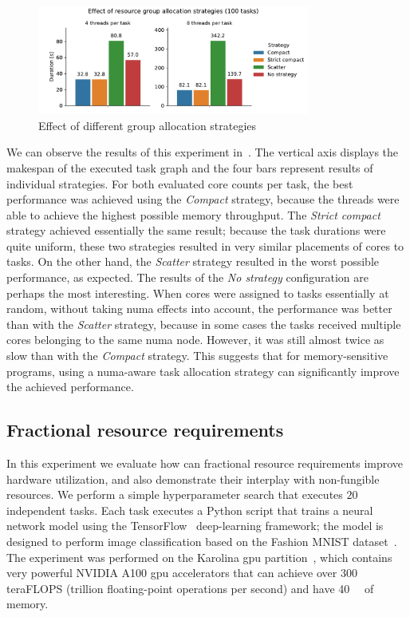 \begin{figure}[h]
	\centering
	\includegraphics[width=0.8\textwidth]{imgs/hq/charts/numa}
	\caption{Effect of different group allocation strategies}
	\label{fig:hq-numa}
\end{figure}

We can observe the results of this experiment in~. The vertical axis displays
the makespan of the executed task graph and the four bars represent results of individual
strategies. For both evaluated core counts per task, the best performance was achieved using the
\emph{Compact} strategy, because the threads were able to achieve the highest possible
memory throughput. The \emph{Strict compact} strategy achieved essentially the same result;
because the task durations were quite uniform, these two strategies resulted in very similar
placements of cores to tasks. On the other hand, the \emph{Scatter} strategy resulted in
the worst possible performance, as expected. The results of the \emph{No strategy}
configuration are perhaps the most interesting. When cores were assigned to tasks essentially at
random, without taking \gls{numa} effects into account, the performance was better
than with the \emph{Scatter} strategy, because in some cases the tasks received multiple
cores belonging to the same \gls{numa} node. However, it was still almost twice as
slow than with the \emph{Compact} strategy. This suggests that for memory-sensitive
programs, using a \gls{numa}-aware task allocation strategy can significantly improve
the achieved performance.

\subsection{Fractional resource requirements}
\label{sec:hq-exp-fractional-resources}
In this experiment we evaluate how can fractional resource requirements improve hardware
utilization, and also demonstrate their interplay with non-fungible resources. We perform a
simple hyperparameter search that executes $20$ independent tasks. Each task executes a Python
script that trains a neural network model using the TensorFlow~\cite{tensorflow}
deep-learning framework; the model is designed to perform image classification based on the
Fashion MNIST dataset~\cite{fashionmnist}. The experiment was performed on the Karolina \gls{gpu}
partition~\cite{karolina_gpu}, which contains very powerful NVIDIA A100 \gls{gpu} accelerators
that can achieve over $300$ teraFLOPS (trillion floating-point operations per
second) and have \SI{40}{\gibi\byte} of memory.

